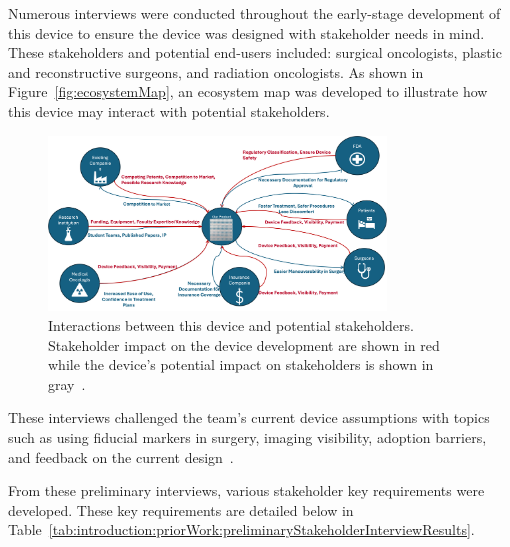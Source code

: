 Numerous interviews were conducted throughout the early-stage development of this device to ensure the device was designed with stakeholder needs in mind. These stakeholders and potential end-users included: surgical oncologists, plastic and reconstructive surgeons, and radiation oncologists. As shown in Figure~\ref{fig:ecosystemMap}, an ecosystem map was developed to illustrate how this device may interact with potential stakeholders.

\begin{figure}[h!]
        \centering
        \includegraphics[width=0.8\textwidth]{../figs/introduction/ecosystem_mapping.png}
        \caption{Interactions between this device and potential stakeholders. Stakeholder impact on the device development are shown in red while the device's potential impact on stakeholders is shown in gray~\cite{RefWorks:RefID:386-bakhtarvisualizing}.}
        \label{fig:introduction:ecosystemMap}
\end{figure}

These interviews challenged the team's current device assumptions with topics such as using fiducial markers in surgery, imaging visibility, adoption barriers, and feedback on the current design~\cite{RefWorks:RefID:371-bakhtardesign}.

From these preliminary interviews, various stakeholder key requirements were developed. These key requirements are detailed below in Table~\ref{tab:introduction:priorWork:preliminaryStakeholderInterviewResults}.


